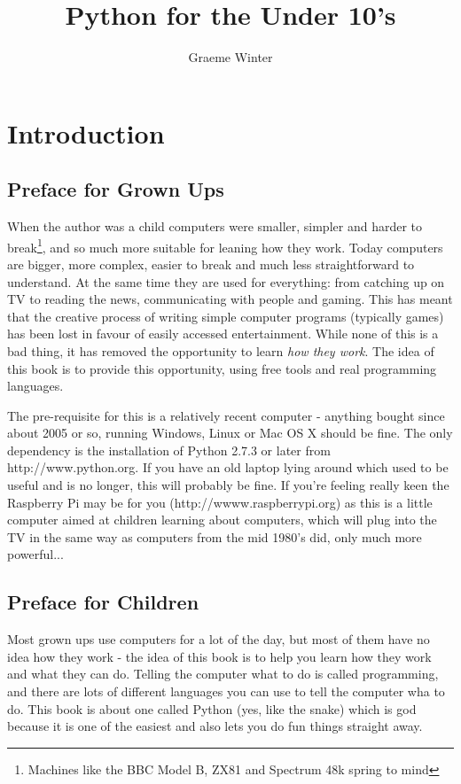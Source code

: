 \documentclass[a4paper, 11pt]{book}
\title{Python for the Under 10's}
\author{Graeme Winter}
\begin{document}
\maketitle
\clearpage
\chapter{Introduction}

\section{Preface for Grown Ups}

When the author was a child computers were smaller, simpler and harder to break\footnote{Machines like the BBC Model B, ZX81 and Spectrum 48k spring to mind}, and so much more suitable for leaning how they work. Today computers are bigger, more complex, easier to break and much less straightforward to understand. At the same time they are used for everything: from catching up on TV to reading the news, communicating with people and gaming. This has meant that the creative process of writing simple computer programs (typically games) has been lost in favour of easily accessed entertainment. While none of this is a bad thing, it has removed the opportunity to learn \emph{how they work}. The idea of this book is to provide this opportunity, using free tools and real programming languages. 

The pre-requisite for this is a relatively recent computer - anything bought since about 2005 or so, running Windows, Linux or Mac OS X should be fine. The only dependency is the installation of Python 2.7.3 or later from http://www.python.org. If you have an old laptop lying around which used to be useful and is no longer, this will probably be fine. If you're feeling really keen the Raspberry Pi may be for you (http://wwww.raspberrypi.org) as this is a little computer aimed at children learning about computers, which will plug into the TV in the same way as computers from the mid 1980's did, only much more powerful...

\section{Preface for Children}

Most grown ups use computers for a lot of the day, but most of them have no idea how they work - the idea of this book is to help you learn how they work and what they can do. Telling the computer what to do is called programming, and there are lots of different languages you can use to tell the computer wha to do. This book is about one called Python (yes, like the snake) which is god because it is one of the easiest and also lets you do fun things straight away.
\end{document}

